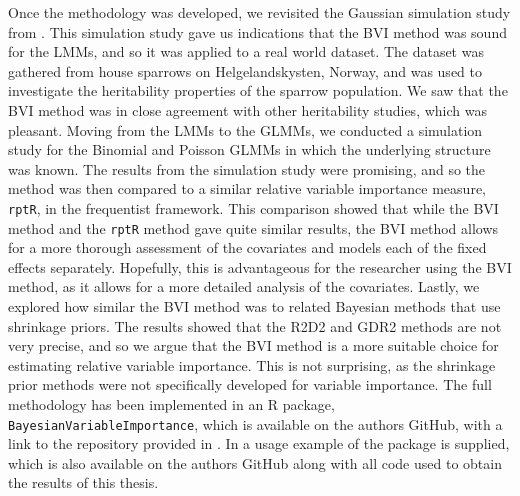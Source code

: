 Once the methodology was developed, we revisited the Gaussian simulation study from \citet{Arnstad:Relative_variable_importance_in_Bayesian_linear_mixed_models:2024}. This simulation study gave us indications that the BVI method was sound for the LMMs, and so it was applied to a real world dataset. The dataset was gathered from house sparrows on Helgelandskysten, Norway, and was used to investigate the heritability properties of the sparrow population. We saw that the BVI method was in close agreement with other heritability studies, which was pleasant. Moving from the LMMs to the GLMMs, we conducted a simulation study for the Binomial and Poisson GLMMs in which the underlying structure was known. The results from the simulation study were promising, and so the method was then compared to a similar relative variable importance measure, \texttt{rptR}, in the frequentist framework. This comparison showed that while the BVI method and the \texttt{rptR} method gave quite similar results, the BVI method allows for a more thorough assessment of the covariates and models each of the fixed effects separately. Hopefully, this is advantageous for the researcher using the BVI method, as it allows for a more detailed analysis of the covariates. Lastly, we explored how similar the BVI method was to related Bayesian methods that use shrinkage priors. The results showed that the R2D2 and GDR2 methods are not very precise, and so we argue that the BVI method is a more suitable choice for estimating relative variable importance. This is not surprising, as the shrinkage prior methods were not specifically developed for variable importance. The full methodology has been implemented in an R package, \texttt{BayesianVariableImportance}, which is available on the authors GitHub, with a link to the repository provided in . In  a usage example of the package is supplied, which is also available on the authors GitHub along with all code used to obtain the results of this thesis.
\\
\\
